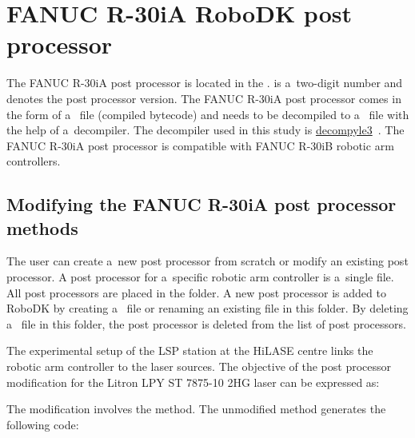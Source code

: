 \section{FANUC R-30iA RoboDK post processor}

The FANUC R-30iA post processor is located in the .  is a~two-digit number and denotes the post processor version. The FANUC R-30iA post processor comes in the form of a~ file (compiled bytecode) and needs to be decompiled to a~ file with the help of a~decompiler. The decompiler used in this study is   \href{https://github.com/rocky/python--decompile3}{decompyle3}~\cite{decompyle3}. The FANUC R-30iA post processor is compatible with FANUC R-30iB robotic arm controllers.

\subsection{Modifying the FANUC R-30iA post processor methods} 
\label{sec:modifying}

The user can create a~new post processor from scratch or modify an existing post processor. A post processor for a~specific robotic arm controller is a~single  file. All post processors are placed in the  folder. A new post processor is added to RoboDK by creating a~ file or renaming an existing  file in this folder. By deleting a~ file in this folder, the post processor is deleted from the list of post processors. 

The experimental setup of the LSP station at the HiLASE centre links the robotic arm controller to the laser sources. The objective of the post processor modification for the Litron LPY ST 7875-10 2HG laser can be expressed as:



The modification involves the  method. The unmodified  method generates the following code:


